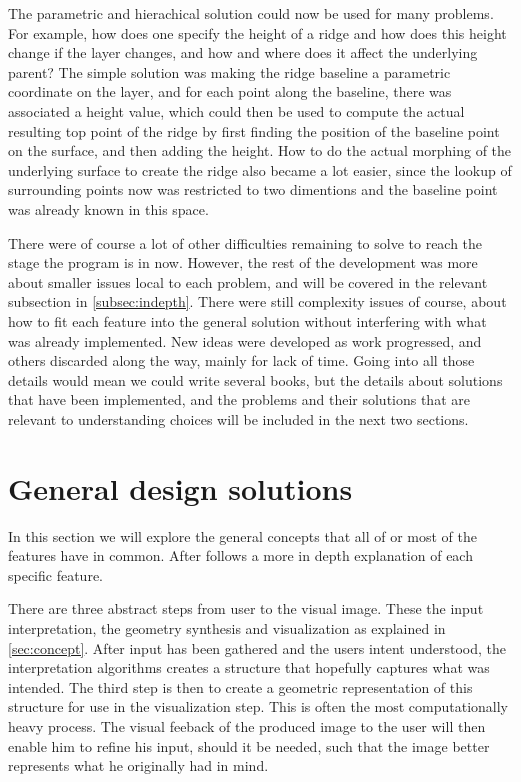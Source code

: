 \documentclass[a4paper,12pt]{report}
\begin{document}
The parametric and hierachical solution could now be used for many problems. For example, how does one specify the height of a ridge and how does this height change if the layer changes, and how and where does it affect the underlying parent? The simple solution was making the ridge baseline a parametric coordinate on the layer, and for each point along the baseline, there was associated a height value, which could then be used to compute the actual resulting top point of the ridge by first finding the position of the baseline point on the surface, and then adding the height. How to do the actual morphing of the underlying surface to create the ridge also became a lot easier, since the lookup of surrounding points now was restricted to two dimentions and the baseline point was already known in this space.

There were of course a lot of other difficulties remaining to solve to reach the stage the program is in now. However, the rest of the development was more about smaller issues local to each problem, and will be covered in the relevant subsection in \ref{subsec:indepth}.  There were still complexity issues of course, about how to fit each feature into the general solution without interfering with what was already implemented. New ideas were developed as work progressed, and others discarded along the way, mainly for lack of time. Going into all those details would mean we could write several books, but the details about solutions that have been implemented, and the problems and their solutions that are relevant to understanding choices will be included in the next two sections.

\section{General design solutions}
\label{subsec:generaldesign}
In this section we will explore the general concepts that all of or most of the features have in common. After follows a more in depth explanation of each specific feature.

There are three abstract steps from user to the visual image. These the input interpretation, the geometry synthesis and visualization as explained in \ref{sec:concept}. After input has been gathered and the users intent understood, the interpretation algorithms creates a structure that hopefully captures what was intended. The third step is then to create a geometric representation of this structure for use in the visualization step. This is often the most computationally heavy process. The visual feeback of the produced image to the user will then enable him to refine his input, should it be needed, such that the image better represents what he originally had in mind. 
\end{document}
